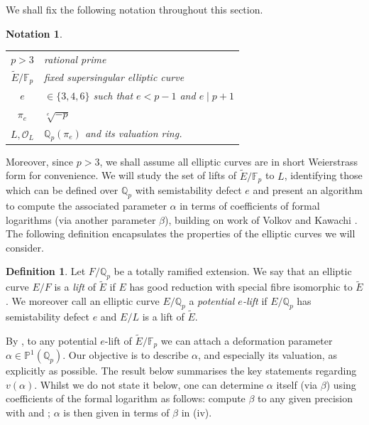 \documentclass{amsart}
\newcommand{\Qp}{\mathbb{Q}_p}
\newtheorem*{notation*}{Notation}
\theoremstyle{definition}
\newtheorem{definition}[theorem]{Definition}
\newcommand{\Q}{\mathbb{Q}}
\newcommand{\F}{\mathbb{F}}
\numberwithin{theorem}{section}
\numberwithin{equation}{section}
\begin{document}
We shall fix the following notation throughout this section.

\begin{notation*}
\phantom{~} \\
\begin{tabular}{cl}
$p>3$ & rational prime \\
$\tilde{E}/\mathbb{F}_p$ & fixed supersingular elliptic curve \\
$e$ & $\in \{3,4,6\}$ such that $e<p-1$ and $e \mid p+1$ \\
$\pi_e$ & $\sqrt[e]{-p}$ \\
$L,\mathcal{O}_L$ & $\Qp(\pi_e)$ and its valuation ring.
\end{tabular}
\end{notation*}

Moreover, since $p>3$, we shall assume all elliptic curves are in short Weierstrass form for convenience. We will study the set of lifts of $\tilde{E}/\mathbb{F}_p$ to $L$, identifying those which can be defined over $\Qp$ with semistability defect $e$ and present an algorithm to compute the associated parameter $\alpha$ in terms of coefficients of formal logarithms (via another parameter $\beta$), building on work of Volkov and Kawachi \cite{Kawachi}. The following definition encapsulates the properties of the elliptic curves we will consider.


\begin{definition}
Let $F/\Qp$ be a totally ramified extension. We say that an elliptic curve $E/F$ is a \emph{lift} of $\tilde{E}$ if $E$ has good reduction with special fibre isomorphic to $\tilde{E}$. We moreover call an elliptic curve $E/\Qp$ a \emph{potential $e$-lift} if $E/\Qp$ has semistability defect $e$ and $E/L$ is a lift of $\tilde{E}$.
\end{definition}

By , to any potential $e$-lift of $\tilde{E}/\F_p$ we can attach a deformation parameter $\alpha \in \mathbb{P}^1(\Q_p)$. Our objective is to describe $\alpha$, and especially its valuation, as explicitly as possible. The result below summarises the key statements regarding $v(\alpha)$. Whilst we do not state it below, one can determine $\alpha$ itself (via $\beta$) using coefficients of the formal logarithm as follows: compute $\beta$ to any given precision with  and ; $\alpha$ is then given in terms of $\beta$ in (iv).
\end{document}
